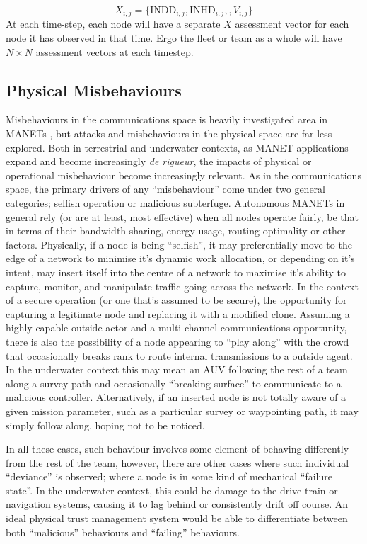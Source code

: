\documentclass[conference,compsoc,letterpaper]{IEEEtran}
\begin{document}
\begin{equation}
  X_{i,j}=\{\text{INDD}_{i,j}, \text{INHD}_{i,j},, V_{i,j}\}
  \label{eq:phys_vector}
\end{equation}
At each time-step, each node will have a separate $X$ assessment vector for each node it has observed in that time. 
Ergo the fleet or team as a whole will have $N\times N$ assessment vectors at each timestep.

\subsection{Physical Misbehaviours}
Misbehaviours in the communications space is heavily investigated area in MANETs \cite{Konate2011}\cite{Wang2009}\cite{Chen2014a}\cite{Mitchell2014}, but attacks and misbehaviours in the physical space are far less explored. 
Both in terrestrial and underwater contexts, as MANET applications expand and become increasingly \emph{de rigueur}, the impacts of physical or operational misbehaviour become increasingly relevant. 
As in the communications space, the primary drivers of any ``misbehaviour'' come under two general categories; selfish operation or malicious subterfuge.
Autonomous MANETs in general rely (or are at least, most effective) when all nodes operate fairly, be that in terms of their bandwidth sharing, energy usage, routing optimality or other factors. 
Physically, if a node is being ``selfish'', it may preferentially move to the edge of a network to minimise it's dynamic work allocation, or depending on it's intent, may insert itself into the centre of a network to maximise it's ability to capture, monitor, and manipulate traffic going across the network. 
In the context of a secure operation (or one that's assumed to be secure), the opportunity for capturing a legitimate node and replacing it with a modified clone.
Assuming a highly capable outside actor and a multi-channel communications opportunity, there is also the possibility of a node appearing to ``play along'' with the crowd that occasionally breaks rank to route internal transmissions to a outside agent.
In the underwater context this may mean an AUV following the rest of a team along a survey path and occasionally ``breaking surface'' to communicate to a malicious controller.
Alternatively, if an inserted node is not totally aware of a given mission parameter, such as a particular survey or waypointing path, it may simply follow along, hoping not to be noticed.

In all these cases, such behaviour involves some element of behaving differently from the rest of the team, however, there are other cases where such individual ``deviance'' is observed; where a node is in some kind of mechanical ``failure state''.
In the underwater context, this could be damage to the drive-train or navigation systems, causing it to lag behind or consistently drift off course. 
An ideal physical trust management system would be able to differentiate between both ``malicious'' behaviours and ``failing'' behaviours.
\end{document}
